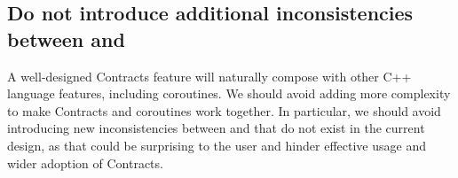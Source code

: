 
%


\subsection{Do not introduce additional inconsistencies between  and }

A well-designed Contracts feature will naturally compose with other C++ language features, including coroutines. We should avoid adding more complexity to make Contracts and coroutines work together. In particular, we should avoid introducing new inconsistencies between  and  that do not exist in the current design, as that could be surprising to the user and hinder effective usage and wider adoption of Contracts.

